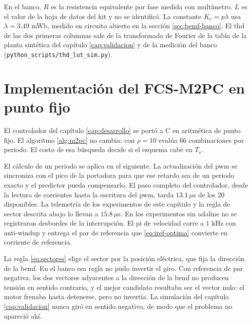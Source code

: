 \documentclass[../../../Tesis_JALS_Maestria.tex]{subfiles}
\begin{document}
En el banco, $R$ es la resistencia equivalente por fase medida con multímetro. $L$ es el valor de la hoja de datos del kit y no se identificó. La constante $K_e = p\lambda$ usa $\lambda = 3.49$ mWb, medido en circuito abierto en la sección \ref{sec:bemf-banco}. El \acrshort{thd} de las dos primeras columnas sale de la transformada de Fourier de la tabla de la planta sintética del capítulo \ref{cap:validacion} y de la medición del banco (\texttt{python\_scripts/thd\_lut\_sim.py}).

\section{Implementación del FCS-M2PC en punto fijo}
\label{sec:impl-fija}

El controlador del capítulo \ref{cap:desarrollo} se portó a C en aritmética de punto fijo. El algoritmo \ref{alg:m2pc} no cambia: con $\rho = 10$ evalúa $66$ combinaciones por periodo. El costo de esa búsqueda decide si el esquema cabe en $T_s$.

El cálculo de un periodo se aplica en el siguiente. La actualización del \acrshort{pwm} se sincroniza con el pico de la portadora para que ese retardo sea de un periodo exacto y el predictor pueda compensarlo. El paso completo del controlador, desde la lectura de corrientes hasta la escritura del \acrshort{pwm}, tarda $13.1\,\mu$s de los $20$ disponibles. La telemetría de los experimentos de este capítulo y la regla de sector descrita abajo lo llevan a $15.8\,\mu$s. En los experimentos sin \acrshort{adaline} no se registraron desbordes de la interrupción. El \acrshort{pi} de velocidad corre a $1$ kHz con anti-windup y entrega el par de referencia que \eqref{eq:iref-optima} convierte en corriente de referencia.

La regla \eqref{eq:sectores} elige el sector por la posición eléctrica, que fija la dirección de la \acrshort{bemf}. En el banco esa regla no pudo invertir el giro. Con referencia de par negativa, los dos vectores adyacentes a la dirección de la \acrshort{bemf} no producen tensión en sentido contrario, y el mejor candidato resultaba ser el vector nulo: el motor frenaba hasta detenerse, pero no invertía. La simulación del capítulo \ref{cap:validacion} nunca giró en sentido negativo, de modo que el problema no apareció ahí.
\end{document}
